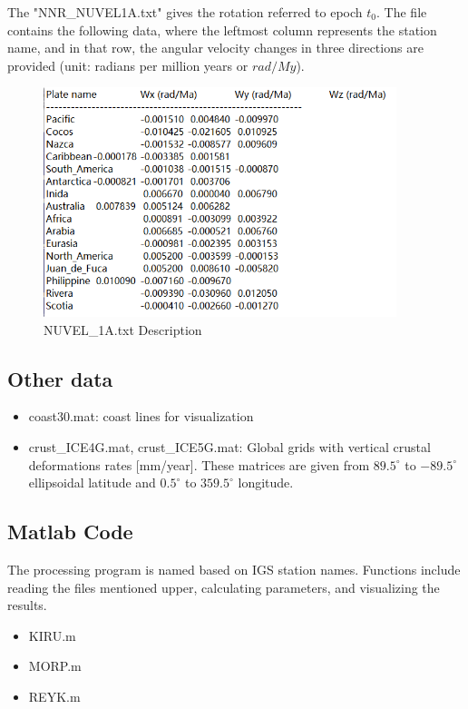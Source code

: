 \documentclass{article}
\begin{document}
The "NNR\_NUVEL1A.txt" gives the rotation referred to epoch $t_0$. 
The file contains the following data, where the leftmost column represents the station name, 
and in that row, the angular velocity changes in three directions are provided (unit: radians per million years or $rad/My$).
\begin{figure}[H]
    \centering
    \includegraphics[width=10.3cm]{../source/nuvel.png}
    \caption{NUVEL\_1A.txt Description}
    \captionsetup{skip=1.5cm}
    \label{fig:Nuvel-1A}
\end{figure}

\subsection{Other data}
\begin{itemize}
  \item coast30.mat: coast lines for visualization
  \item crust\_ICE4G.mat, crust\_ICE5G.mat: Global grids with vertical crustal deformations rates [mm/year].
  These matrices are given from $89.5^{\circ}$ to $-89.5^{\circ}$ ellipsoidal latitude and $0.5^{\circ}$ to $359.5^{\circ}$ longitude.
\end{itemize}

\subsection{Matlab Code}
The processing program is named based on IGS station names. Functions include reading the files mentioned upper, calculating parameters, and visualizing the results.
\begin{itemize}
  \item KIRU.m
  \item MORP.m
  \item REYK.m
\end{itemize}
\end{document}
